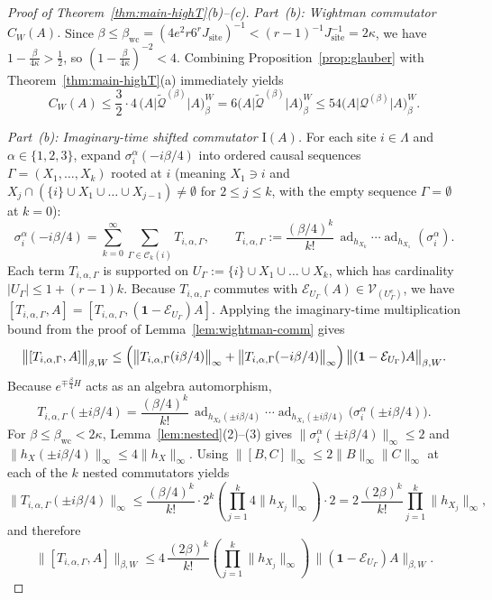 \documentclass[11pt,a4paper]{article}
\numberwithin{equation}{section}
\theoremstyle{plain}
\theoremstyle{definition}
\newcommand{\ad}{\operatorname{ad}}
\begin{document}
\begin{proof}[Proof of Theorem~\ref{thm:main-highT}(b)--(c)]
\emph{Part~(b): Wightman commutator $C_W(A)$.} Since $\beta \le \beta_{\mathrm{wc}} = (4e^2 r 6^r J_{\mathrm{site}})^{-1} < (r-1)^{-1}J_{\mathrm{site}}^{-1} = 2\kappa$, we have $1 - \frac{\beta}{4\kappa} > \frac{1}{2}$, so $(1-\frac{\beta}{4\kappa})^{-2} < 4$. Combining Proposition~\ref{prop:glauber} with Theorem~\ref{thm:main-highT}(a) immediately yields
\[
  C_W(A) \le \frac{3}{2}\cdot 4\,\bigl(A\big|\widetilde{\mathcal{Q}}^{(\beta)}\big|A\bigr)_\beta^W
  = 6\bigl(A\big|\widetilde{\mathcal{Q}}^{(\beta)}\big|A\bigr)_\beta^W
  \le 54\bigl(A\big|\mathcal{Q}^{(\beta)}\big|A\bigr)_\beta^W.
\]

\emph{Part~(b): Imaginary-time shifted commutator $\mathrm{I}(A)$.} For each site $i\in\Lambda$ and $\alpha\in\{1,2,3\}$, expand $\sigma_i^\alpha(-i\beta/4)$ into ordered causal sequences $\Gamma = (X_1,\dots,X_k)$ rooted at $i$ (meaning $X_1\ni i$ and $X_j\cap(\{i\}\cup X_1\cup\dots\cup X_{j-1})\ne\emptyset$ for $2\le j\le k$, with the empty sequence $\Gamma=\emptyset$ at $k=0$):
\[
  \sigma_i^\alpha(-i\beta/4) = \sum_{k=0}^\infty \sum_{\Gamma\in\mathcal{C}_k(i)} T_{i,\alpha,\Gamma},
  \qquad T_{i,\alpha,\Gamma} := \frac{(\beta/4)^k}{k!}\,\ad_{h_{X_k}}\cdots\ad_{h_{X_1}}(\sigma_i^\alpha).
\]
Each term $T_{i,\alpha,\Gamma}$ is supported on $U_\Gamma := \{i\}\cup X_1\cup\dots\cup X_k$, which has cardinality $|U_\Gamma| \le 1 + (r-1)k$. Because $T_{i,\alpha,\Gamma}$ commutes with $\mathcal{E}_{U_\Gamma}(A)\in\mathcal{V}_{(U_\Gamma^c)}$, we have $[T_{i,\alpha,\Gamma}, A] = [T_{i,\alpha,\Gamma}, (\mathbf{1}-\mathcal{E}_{U_\Gamma})A]$. Applying the imaginary-time multiplication bound from the proof of Lemma~\ref{lem:wightman-comm} gives
\[
  \bigl\|[T_{i,\alpha,\Gamma}, A]\bigr\|_{\beta,W}
  \le \Bigl(\bigl\|T_{i,\alpha,\Gamma}(i\beta/4)\bigr\|_\infty + \bigl\|T_{i,\alpha,\Gamma}(-i\beta/4)\bigr\|_\infty\Bigr)\,\bigl\|(\mathbf{1}-\mathcal{E}_{U_\Gamma})A\bigr\|_{\beta,W}.
\]
Because $e^{\mp\frac{\beta}{4}H}$ acts as an algebra automorphism,
\[
  T_{i,\alpha,\Gamma}(\pm i\beta/4)
  = \frac{(\beta/4)^k}{k!}\,\ad_{h_{X_k}(\pm i\beta/4)}\cdots\ad_{h_{X_1}(\pm i\beta/4)}\bigl(\sigma_i^\alpha(\pm i\beta/4)\bigr).
\]
For $\beta\le\beta_{\mathrm{wc}} < 2\kappa$, Lemma~\ref{lem:nested}(2)--(3) gives $\|\sigma_i^\alpha(\pm i\beta/4)\|_\infty \le 2$ and $\|h_X(\pm i\beta/4)\|_\infty \le 4\|h_X\|_\infty$. Using $\|[B,C]\|_\infty \le 2\|B\|_\infty\|C\|_\infty$ at each of the $k$ nested commutators yields
\[
  \bigl\|T_{i,\alpha,\Gamma}(\pm i\beta/4)\bigr\|_\infty
  \le \frac{(\beta/4)^k}{k!}\cdot 2^k \left(\prod_{j=1}^k 4\|h_{X_j}\|_\infty\right)\cdot 2
  = 2\,\frac{(2\beta)^k}{k!}\prod_{j=1}^k \|h_{X_j}\|_\infty,
\]
and therefore
\begin{equation}\label{eq:Tgamma-comm}
  \bigl\|[T_{i,\alpha,\Gamma}, A]\bigr\|_{\beta,W}
  \le 4\,\frac{(2\beta)^k}{k!}\left(\prod_{j=1}^k \|h_{X_j}\|_\infty\right)\,\bigl\|(\mathbf{1}-\mathcal{E}_{U_\Gamma})A\bigr\|_{\beta,W}.
\end{equation}


\end{proof}
\end{document}
